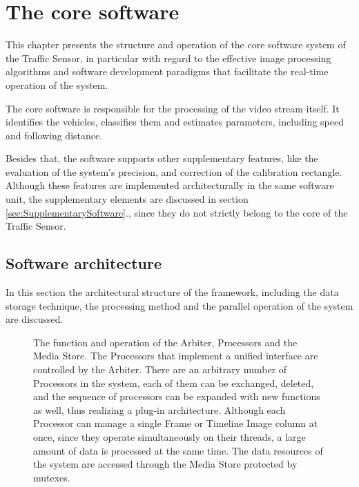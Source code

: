 \chapter{The core software}\label{chap:Core software}
This chapter presents the structure and operation of the core software system of the Traffic Sensor, in particular with regard to the effective image processing algorithms and software development paradigms that facilitate the real-time operation of the system.

The core software is responsible for the processing of the video stream itself.
It identifies the vehicles, classifies them and estimates parameters, including speed and following distance.
 
Besides that, the software supports other supplementary features, like the evaluation of the system's precision, and correction of the calibration rectangle.
Although these features are implemented architecturally in the same software unit, the supplementary elements are discussed in section \ref{sec:SupplementarySoftware}., since they do not strictly belong to the core of the Traffic Sensor.
\section{Software architecture}
In this section the architectural structure of the framework, including the data storage technique, the processing method and the parallel operation of the system are discussed.

\begin{figure}[!h]
	\centering
	
	\caption{The function and operation of the Arbiter, Processors and the Media Store. The Processors that implement a unified interface are controlled by the Arbiter. There are an arbitrary number of Processors in the system, each of them can be exchanged, deleted, and the sequence of processors can be expanded with new functions as well, thus realizing a plug-in architecture. Although each Processor can manage a single Frame or Timeline Image column at once, since they operate simultaneously on their threads, a large amount of data is processed at the same time. The data resources of the system are accessed through the Media Store protected by mutexes.\label{fig:arbiter_pipeline}}
\end{figure}

